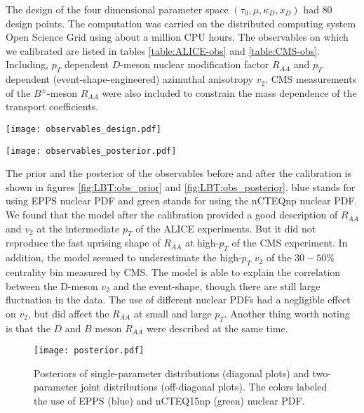 The design of the four dimensional parameter space  $(\tau_0, \mu, \kappa_D, x_D)$ had 80 design points.
The computation was carried on the distributed computing system Open Science Grid \cite{Pordes:2007zzb,Sfiligoi:2010zz} using about a million CPU hours.
The observables on which we calibrated are listed in tables \ref{table:ALICE-obs} and \ref{table:CMS-obs}. 
Including, $p_T$ dependent $D$-meson nuclear modification factor $R_{AA}$ and $p_T$ dependent (event-shape-engineered) azimuthal anisotropy $v_2$.
CMS measurements of the $B^{\pm}$-meson $R_{AA}$ were also included to constrain the mass dependence of the transport coefficients.

\begin{figure*}
\texttt{[image: observables\_design.pdf]}
\caption{The prior distribution of calculated observables compared to data. The colors labeled the use of EPPS (blue) and nCTEQ15np (green) nuclear PDF.}
\label{fig:LBT:obs_prior}
\end{figure*}

\begin{figure*}
\texttt{[image: observables\_posterior.pdf]}
\caption{The 90\% credible region of the posterior distribution of observables compared to data. The colors labeled the use of EPPS (blue) and nCTEQ15np (green) nuclear PDF.}
\label{fig:LBT:obs_posterior}
\end{figure*}

The prior and the posterior of the observables before and after the calibration is shown in figures \ref{fig:LBT:obs_prior} and \ref{fig:LBT:obs_posterior}.
blue stands for using EPPS nuclear PDF and green stands for using the nCTEQnp nuclear PDF.
We found that the model after the calibration provided a good description of $R_{AA}$ and $v_2$ at the intermediate $p_T$ of the ALICE experiments.
But it did not reproduce the fast uprising shape of $R_{AA}$ at high-$p_T$ of the CMS experiment.
In addition, the model seemed to underestimate the high-$p_T$ $v_2$ of the $30-50\%$ centrality bin measured by CMS.
The model is able to explain the correlation between the D-meson $v_2$ and the event-shape, though there are still large fluctuation in the data.
The use of different nuclear PDFs had a negligible effect on $v_2$, but did affect the $R_{AA}$ at small and large $p_T$.
Another thing worth noting is that the $D$ and $B$ meson $R_{AA}$ were described at the same time.

\begin{figure}
\centering
\texttt{[image: posterior.pdf]}
\caption{Posteriors of single-parameter distributions (diagonal plots) and two-parameter joint distributions (off-diagonal plots). The colors labeled the use of EPPS (blue) and nCTEQ15np (green) nuclear PDF.}
\label{fig:LBT:posterior}
\end{figure}

